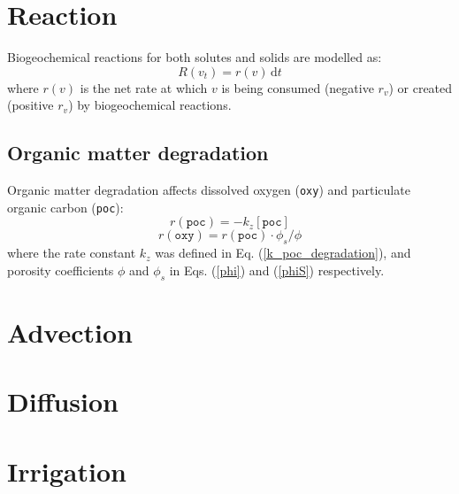 \documentclass{article}
\newcommand{\D}[1]{\mathrm{d}#1}
\newcommand{\code}[1]{\texttt{#1}}
\newcommand{\conc}[1]{[\code{#1}]}
\newcommand{\eqref}[1]{(\ref{#1})}
\begin{document}
\section{Reaction}

Biogeochemical reactions for both solutes and solids are modelled as:
\begin{equation}
R(v_t) = r(v) \, \D{t}
\end{equation}
where $r(v)$ is the net rate at which $v$ is being consumed (negative $r_v$) or created (positive $r_v$) by biogeochemical reactions.

\subsection{Organic matter degradation}

Organic matter degradation affects dissolved oxygen (\code{oxy}) and particulate organic carbon (\code{poc}):
\begin{equation}
r(\code{poc}) = -k_z \conc{poc}
\end{equation}
\begin{equation}
r(\code{oxy}) = r(\code{poc}) \cdot \phi_s / \phi
\end{equation}
where the rate constant $k_z$ was defined in Eq. \eqref{k_poc_degradation}, and porosity coefficients $\phi$ and $\phi_s$ in Eqs. \eqref{phi} and \eqref{phiS} respectively.

\section{Advection}

\section{Diffusion}

\section{Irrigation}
\end{document}
